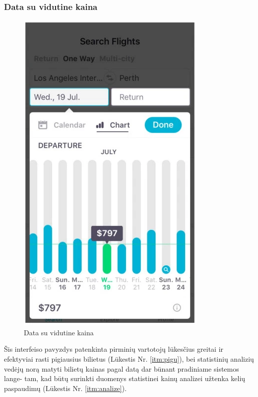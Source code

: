 \documentclass{VUMIFPSkursinis}
\begin{document}
\subsubsection{Data su vidutine kaina}
\begin{figure}[H]
    \centering
    \includegraphics[scale=1]{img/skyscanner.png}
    \caption{Data su vidutine kaina}
    \label{img:data2}
\end{figure}
Šis interfeiso pavyzdys patenkinta pirminių vartotojų lūkesčius greitai ir efektyviai rasti pigiausius bilietus (Lūkestis Nr. \ref{itm:pigu}), bei statistinių analizių vedėjų norą matyti bilietų kainas pagal datą dar būnant pradiniame sistemos lange- tam, kad būtų surinkti duomenys statistinei kainų analizei užtenka kelių paspaudimų (Lūkestis Nr. \ref{itm:analize}).
\end{document}
